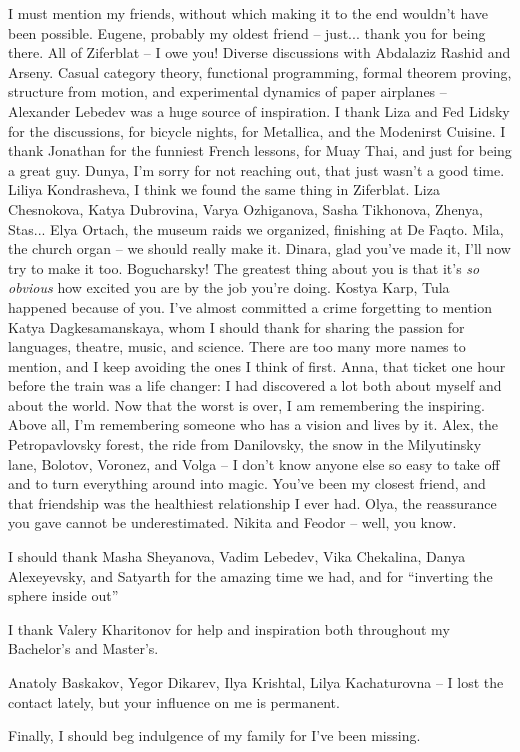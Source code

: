 I must mention my friends, without which making it to the end wouldn't have
been possible. Eugene, probably my oldest friend -- just... thank you for being
there. All of Ziferblat -- I owe you! Diverse discussions with Abdalaziz Rashid
and Arseny. Casual category theory, functional programming, formal
theorem proving, structure from motion, and experimental dynamics of paper
airplanes -- Alexander Lebedev was a huge source of inspiration. I thank Liza
and Fed Lidsky for the discussions, for bicycle nights, for Metallica, and the
Modenirst Cuisine. I thank Jonathan for the funniest French lessons, for Muay
Thai, and just for being a great guy. Dunya, I'm sorry for not reaching out,
that just wasn't a good time. Liliya Kondrasheva, I think we found the same thing
in Ziferblat. Liza Chesnokova, Katya Dubrovina, Varya Ozhiganova, Sasha
Tikhonova, Zhenya, Stas... Elya Ortach, the museum raids we organized, finishing
at De Faqto. Mila, the church organ -- we should really make it. Dinara, glad
you've made it, I'll now try to make it too. Bogucharsky! The greatest thing
about you is that it's \emph{so obvious} how excited you are by the job you're doing.
Kostya Karp, Tula happened because of you. I've almost committed a crime
forgetting to mention Katya Dagkesamanskaya, whom I should thank for sharing
the passion for languages, theatre, music, and science.
There are too many more names to
mention, and I keep avoiding the ones I think of first. Anna, that ticket one
hour before the train was a life changer: I had discovered a lot both about
myself and about the world. Now that the worst is over, I am remembering the
inspiring. Above all, I'm remembering someone who has a vision and lives by it.
Alex, the Petropavlovsky forest, the ride from Danilovsky, the snow in the
Milyutinsky lane, Bolotov, Voronez, and Volga -- I don't know anyone else so
easy to take off and to turn everything around into magic. You've been my
closest friend, and that friendship was the healthiest relationship I ever had.
Olya, the reassurance you gave cannot be underestimated.
Nikita and Feodor -- well, you know.

I should thank Masha Sheyanova, Vadim Lebedev, Vika Chekalina, Danya
Alexeyevsky, and Satyarth for the amazing time we had, and for ``inverting the
sphere inside out''

I thank Valery Kharitonov for help and inspiration both throughout my
Bachelor's and Master's.

Anatoly Baskakov, Yegor Dikarev, Ilya Krishtal, Lilya Kachaturovna -- I lost
the contact lately, but your influence on me is permanent.

Finally, I should beg indulgence of my family for I've been missing.
